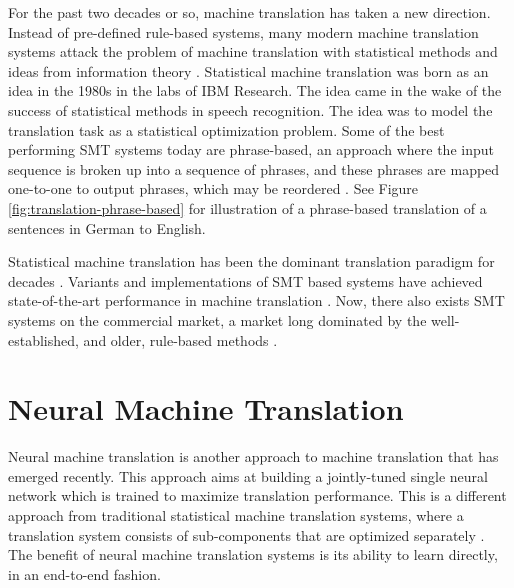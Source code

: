 For the past two decades or so, machine translation has taken a new direction. Instead of pre-defined rule-based systems, many modern machine translation systems attack the problem of machine translation with statistical methods and ideas from information theory \citep{brown1990statistical}. Statistical machine translation was born as an idea in the 1980s in the labs of IBM Research. The idea came in the wake of the success of statistical methods in speech recognition. The idea was to model the translation task as a statistical optimization problem. Some of the best performing SMT systems today are phrase-based, an approach where the input sequence is broken up into a sequence of phrases, and these phrases are mapped one-to-one to output phrases, which may be reordered \citep{koehn2010statistical}. See Figure \ref{fig:translation-phrase-based} for illustration of a phrase-based translation of a sentences in German to English.

Statistical machine translation has been the dominant translation paradigm for decades \citep{wu2016google}. Variants and implementations of SMT based systems have achieved state-of-the-art performance in machine translation \citep{watanabe07onlinelargemargin}. Now, there also exists SMT systems on the commercial market, a market long dominated by the well-established, and older, rule-based methods \citep{hutchins2007machine}.


\section{Neural Machine Translation}
\label{sec:neural_machine_translation}
Neural machine translation is another approach to machine translation that has emerged recently. This approach aims at building a jointly-tuned single neural network which is trained to maximize translation performance. This is a different approach from traditional statistical machine translation systems, where a translation system consists of sub-components that are optimized separately \citep{wolk2015neural}. The benefit of neural machine translation systems is its ability to learn directly, in an end-to-end fashion. 


